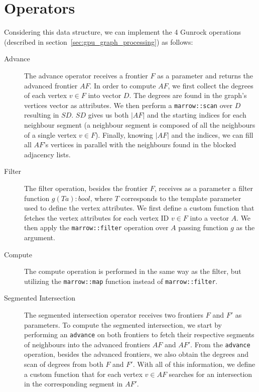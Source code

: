 \section{Operators}

Considering this data structure, we can implement the 4 Gunrock operations (described in section~\ref{sec:gpu_graph_processing}) as follows:
\begin{description}

    \item[Advance] The advance operator receives a frontier $F$ as a parameter and returns the advanced frontier $AF$. 
    In order to compute $AF$, we first collect the degrees of each vertex $v \in F$ into vector $D$. The degrees are found in the graph's vertices vector as attributes. We then perform a \texttt{marrow::scan} over $D$ resulting in $SD$. $SD$ gives us both $|AF|$ and the starting indices for each neighbour segment (a neighbour segment is composed of all the neighbours of a single vertex $v \in F$). Finally, knowing $|AF|$ and the indices, we can fill all $AF$'s vertices in parallel with the neighbours found in the blocked adjacency lists.
    
    
    \item [Filter] The filter operation, besides the frontier $F$, receives as a parameter a filter function $g(T a) : bool$, where $T$ corresponds to the template parameter used to define the vertex attributes. We first define a custom function that fetches the vertex attributes for each vertex ID $v \in F$ into a vector $A$. We then apply the \texttt{marrow::filter} operation over $A$ passing function $g$ as the argument.
    
    \item [Compute] The compute operation is performed in the same way as the filter, but utilizing the \texttt{marrow::map} function instead of \texttt{marrow::filter}.%
    
    \item [Segmented Intersection] The segmented intersection operator receives two frontiers $F$ and $F'$ as parameters. To compute the segmented intersection, we start by performing an \texttt{advance} on both frontiers to fetch their respective segments of neighbours into the advanced frontiers $AF$ and $AF'$. From the \texttt{advance} operation, besides the advanced frontiers, we also obtain the degrees and scan of degrees from both $F$ and $F'$. With all of this information, we define a custom function that for each vertex $v \in AF$ searches for an intersection in the corresponding segment in $AF'$.
    
\end{description}

